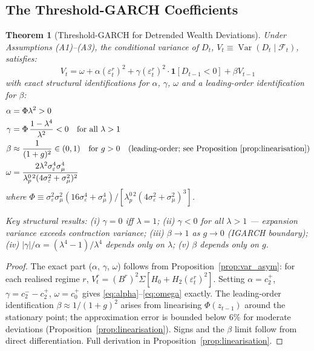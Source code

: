 \documentclass[12pt,a4paper]{article}
\newtheorem{theorem}{Theorem}[section]
\theoremstyle{definition}
\begin{document}
\subsection{The Threshold-GARCH Coefficients}
\label{sec:tgarch}


\begin{theorem}[Threshold-GARCH for Detrended Wealth Deviations]
\label{thm:main}
Under Assumptions (A1)--(A3), the conditional variance of $D_t$,
$V_t \equiv \operatorname{Var}(D_t \mid \mathcal{F}_t)$, satisfies:
\begin{equation}
  V_t = \omega + \alpha(\varepsilon^r_t)^2
       + \gamma(\varepsilon^r_t)^2\cdot\mathbf{1}[D_{t-1}<0]
       + \beta V_{t-1}
  \label{eq:tgarch}
\end{equation}
with exact structural identifications for $\alpha$, $\gamma$, $\omega$
and a leading-order identification for $\beta$:
\begin{align}
  \alpha &= \Phi\lambda^2 > 0
    \label{eq:alpha} \\
  \gamma &= \Phi\,\frac{1-\lambda^4}{\lambda^2} < 0
    \quad \text{for all } \lambda > 1
    \label{eq:gamma} \\
  \beta  &\approx \frac{1}{(1+g)^2} \in (0,1)
    \quad \text{for } g > 0 \quad \text{(leading-order; see Proposition~\ref{prop:linearisation})}
    \label{eq:beta} \\
  \omega &= \frac{2\lambda^2\sigma^4_\varepsilon\sigma^4_\mu}
             {\lambda^{0\,2}_p(4\sigma^2_\varepsilon+\sigma^2_\mu)^2}
    \label{eq:omega}
\end{align}
where $\Phi \equiv \sigma^2_\varepsilon\sigma^2_\mu(16\sigma^4_\varepsilon
+\sigma^4_\mu) / [\lambda^{0\,2}_p(4\sigma^2_\varepsilon+\sigma^2_\mu)^3]$.

Key structural results: (i) $\gamma = 0$ iff $\lambda = 1$; (ii) $\gamma < 0$
for all $\lambda > 1$ --- expansion variance exceeds contraction variance;
(iii) $\beta \to 1$ as $g \to 0$ (IGARCH boundary); (iv) $|\gamma|/\alpha =
(\lambda^4-1)/\lambda^4$ depends only on $\lambda$; (v) $\beta$ depends only
on $g$.
\end{theorem}

\begin{proof}
The exact part ($\alpha$, $\gamma$, $\omega$) follows from
Proposition~\ref{prop:var_asym}: for each realised regime $r$,
$V^r_t = (B^r)^2\Sigma[H_0 + H_2(\varepsilon^r_t)^2]$.
Setting $\alpha = c_2^+$, $\gamma = c_2^- - c_2^+$, $\omega = c_0^+$
gives \eqref{eq:alpha}--\eqref{eq:omega} exactly. The leading-order
identification $\beta \approx 1/(1+g)^2$ arises from linearising
$\Phi(z_{t-1})$ around the stationary point; the approximation error
is bounded below 6\% for moderate deviations (Proposition~\ref{prop:linearisation}).
Signs and the $\beta$ limit follow from direct differentiation.
Full derivation in Proposition~\ref{prop:linearisation}.
\end{proof}
\end{document}
